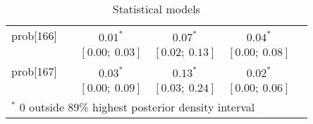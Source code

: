 \begin{table}
\begin{center}
\begin{tabular}{l c c c c c }
prob[166]   &                                  & $0.01^{*}$                & $0.07^{*}$                & $0.04^{*}$              &                         \\
            &                                  & $[0.00;\ 0.03]$           & $[0.02;\ 0.13]$           & $[0.00;\ 0.08]$         &                         \\
prob[167]   &                                  & $0.03^{*}$                & $0.13^{*}$                & $0.02^{*}$              &                         \\
            &                                  & $[0.00;\ 0.09]$           & $[0.03;\ 0.24]$           & $[0.00;\ 0.06]$         &                         \\
\hline
\multicolumn{6}{l}{\scriptsize{$^*$ 0 outside 89\% highest posterior density interval}}
\end{tabular}
\caption{Statistical models}
\label{table:coefficients}
\end{center}
\end{table}

